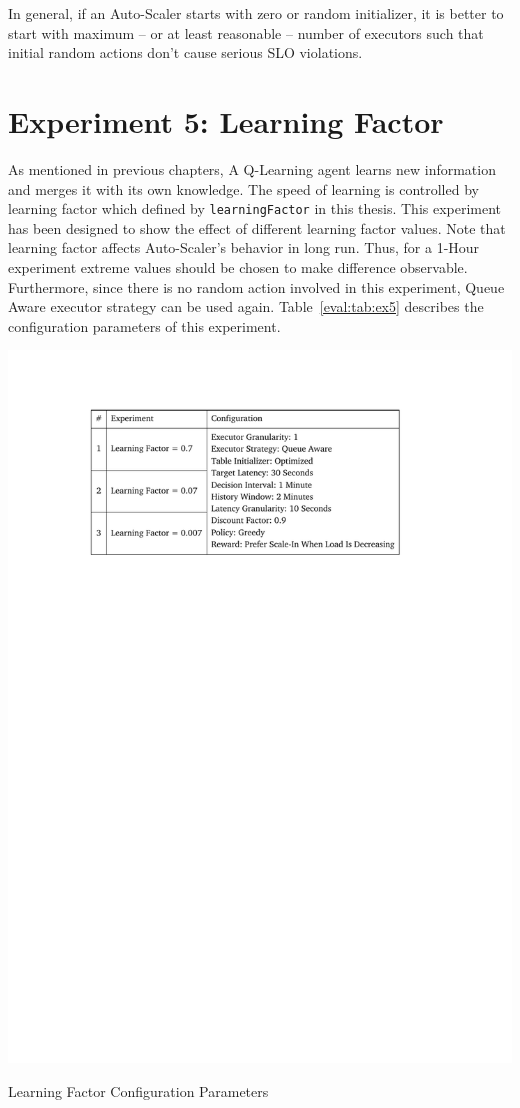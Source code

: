 In general, if an Auto-Scaler starts with zero or random initializer, it is better to start with maximum -- or at least reasonable -- number of executors such that initial random actions don't cause serious SLO violations.

\clearpage
\section{Experiment 5: Learning Factor}
As mentioned in previous chapters, A Q-Learning agent learns new information and merges it with its own knowledge. The speed of learning is controlled by learning factor which defined by \lstinline|learningFactor| in this thesis. This experiment has been designed to show the effect of different learning factor values. Note that learning factor affects Auto-Scaler's behavior in long run. Thus, for a 1-Hour experiment extreme values should be chosen to make difference observable. Furthermore, since there is no random action involved in this experiment, Queue Aware executor strategy can be used again. Table~\ref{eval:tab:ex5} describes the configuration parameters of this experiment. 
\begin{table}[h]
    \includegraphics[clip,trim=3.3cm 21.18cm 4.5cm 2.5cm]{tables/ex5.pdf}
    \centering
    \caption{Learning Factor Configuration Parameters}
    \label{eval:tab:ex5}
\end{table}

